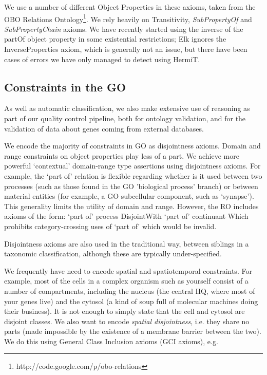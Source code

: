 \documentclass{llncs}
\begin{document}
We use a number of different Object Properties in these axioms, taken
from the OBO Relations
Ontology\footnote{http://code.google.com/p/obo-relations}. We rely
heavily on Transitivity, \emph{SubPropertyOf} and
\emph{SubPropertyChain} axioms. We have recently started using the
inverse of the partOf object property in some existential
restrictions\cite{berardini2010gene}; Elk ignores the
InverseProperties axiom, which is generally not an issue, but there
have been cases of errors we have only managed to detect using HermiT.

\subsection{Constraints in the GO}

As well as automatic classification, we also make extensive use of
reasoning as part of our quality control pipeline, both for ontology
validation, and for the validation of data about genes coming from
external databases.


We encode the majority of constraints in GO as disjointness axioms.
Domain and range constraints on object properties play less of a
part. We achieve more powerful ‘contextual’ domain-range type
assertions using disjointness axioms. For example, the `part of'
relation is flexible regarding whether is it used between two
processes (such as those found in the GO 'biological process' branch)
or between material entities (for example, a GO subcellular component,
such as ‘synapse’). This generality limits the utility of domain and
range. However, the RO includes axioms of the form: `part of' process
DisjointWith `part of' continuant Which prohibits category-crossing
uses of `part of' which would be invalid.

Disjointness axioms are also used in the traditional way, between
siblings in a taxonomic classification, although these are typically
under-specified.

We frequently have need to encode spatial and spatiotemporal
constraints. For example, most of the cells in a complex organism such
as yourself consist of a number of compartments, including the nucleus
(the central HQ, where most of your genes live) and the cytosol (a
kind of soup full of molecular machines doing their business). It is
not enough to simply state that the cell and cytosol are disjoint
classes. We also want to encode \emph{spatial disjointness}, i.e. they
share no parts (made impossible by the existence of a membrane barrier
between the two). We do this using General Class Inclusion axioms (GCI
axioms), e.g.
\end{document}

